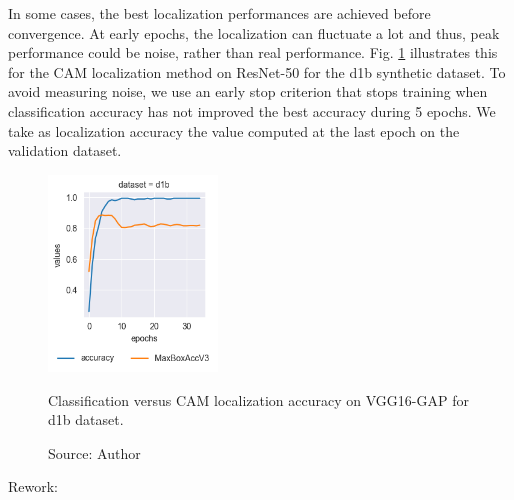 In some cases, the best localization performances are achieved before convergence. At early epochs, the localization can fluctuate a lot and thus, peak performance could be noise, rather than real performance. Fig. \ref{fig:loc_vs_acc_resnet50_cam_d1b} illustrates this for the CAM localization method on ResNet-50 for the d1b synthetic dataset. To avoid measuring noise, we use an early stop criterion that stops training when classification accuracy has not improved the best accuracy during 5 epochs. We take as localization accuracy the value computed at the last epoch on the validation dataset.

\begin{figure}[ht]
\begin{center}
    \includegraphics[width=0.4\textwidth]{images/fig_loc_vs_acc_resnet50_cam_d1b.png}
    \caption[Classification versus CAM localization accuracy on VGG16-GAP for d1b dataset]{Classification versus CAM localization accuracy on VGG16-GAP for d1b dataset.}
    \caption*{Source: Author}
    \label{fig:loc_vs_acc_resnet50_cam_d1b}
\end{center}
\end{figure}


Rework:



